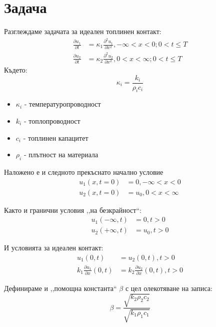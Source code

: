 \setcounter{page}{2}

\section{Задача}
Разглеждаме задачата за идеален топлинен контакт:
\begin{align}
	\frac{\partial u_1}{\partial t} & = \kappa_{1}  \frac{\partial ^ 2 u_1}{\partial x ^ 2}, - \infty < x < 0; 0 < t \leq T \\ 
	\frac{\partial u_2}{\partial t} & = \kappa_{2}  \frac{\partial ^ 2 u_2}{\partial x ^ 2}, 0 < x < \infty; 0 < t \leq T   
\end{align}
Където:
\begin{equation}
	\kappa_{i} = \frac{k_{i}}{\rho_{i} c_{i}}
\end{equation}

\begin{itemize}
	\item $\kappa_{i}$ - температуропроводност
	\item $k_{i}$ - топлопроводност
	\item $c_{i}$ - топлинен капацитет
	\item $\rho_{i}$  - плътност на материала
\end{itemize}

Наложено е и следното прекъснато начално условие
\begin{align}
	u_{1}(x, t = 0) & = 0, -\infty < x < 0  \\
	u_{2}(x, t = 0) & = u_0, 0 < x < \infty 
\end{align}

Както и гранични условия ,,на безкрайност``:
\begin{align}
	u_{1}(-\infty, t) & = 0, t > 0   \\
	u_{2}(+\infty, t) & = u_0, t > 0 
\end{align}
 
И условията за идеален контакт:
\begin{align}
	u_{1}(0, t)                                 & = u_2(0, t),  t > 0                                  \\
	k_{1}\frac{\partial u_1}{\partial x} (0, t) & = k_{2}\frac{\partial u_2}{\partial x} (0, t), t > 0 
\end{align}

Дефинираме и ,,помощна константа`` $\beta$ с цел олекотяване на записа:
\begin{equation*}
	\beta = \frac{\sqrt{k_2 \rho_2 c_2}}{\sqrt{k_1 \rho_1 c_1}}
\end{equation*}

